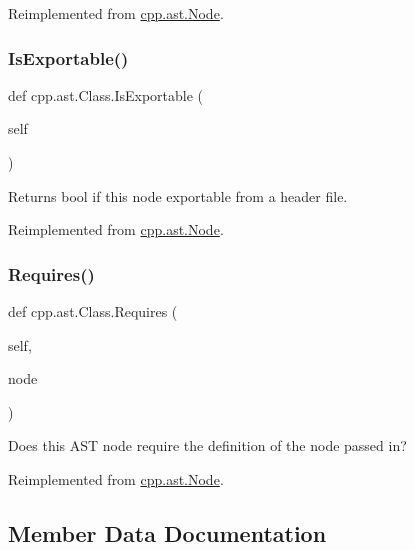 Reimplemented from \mbox{\hyperlink{classcpp_1_1ast_1_1_node_a684ee9a357168e7e07a24fc6812f66e6}{cpp.\+ast.\+Node}}.

\mbox{\label{classcpp_1_1ast_1_1_class_a1ab749f8cfddb0903c6484791f70f42e}} 
\subsubsection{\texorpdfstring{IsExportable()}{IsExportable()}}
{\footnotesize\ttfamily def cpp.\+ast.\+Class.\+Is\+Exportable (\begin{DoxyParamCaption}\item[{}]{self }\end{DoxyParamCaption})}

\begin{DoxyVerb}Returns bool if this node exportable from a header file.\end{DoxyVerb}
 

Reimplemented from \mbox{\hyperlink{classcpp_1_1ast_1_1_node_a313273874ccf578485006d4000128234}{cpp.\+ast.\+Node}}.

\mbox{\label{classcpp_1_1ast_1_1_class_a347673e0a2a7b840b7d2d1cae13977f7}} 
\subsubsection{\texorpdfstring{Requires()}{Requires()}}
{\footnotesize\ttfamily def cpp.\+ast.\+Class.\+Requires (\begin{DoxyParamCaption}\item[{}]{self,  }\item[{}]{node }\end{DoxyParamCaption})}

\begin{DoxyVerb}Does this AST node require the definition of the node passed in?\end{DoxyVerb}
 

Reimplemented from \mbox{\hyperlink{classcpp_1_1ast_1_1_node_a31ae211f954a8c578ef16226df5ac8c8}{cpp.\+ast.\+Node}}.



\subsection{Member Data Documentation}
\mbox{\label{classcpp_1_1ast_1_1_class_a5665eb67314a075d4e0ff91accbde5d1}} 
